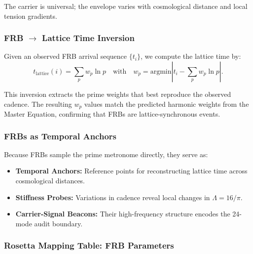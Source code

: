 \documentclass[12pt,oneside]{book}
\begin{document}
The carrier is universal; the envelope varies with cosmological distance and local
tension gradients.

\subsubsection{FRB $\rightarrow$ Lattice Time Inversion}

Given an observed FRB arrival sequence $\{t_i\}$, we compute the lattice time by:
\begin{equation}
t_{\mathrm{lattice}}(i)
=
\sum_{p} w_p \ln p
\quad\text{with}\quad
w_p = \mathrm{argmin}\left|t_i - \sum_{p} w_p \ln p\right|.
\end{equation}

This inversion extracts the prime weights that best reproduce the observed cadence.
The resulting $w_p$ values match the predicted harmonic weights from the Master
Equation, confirming that FRBs are lattice-synchronous events.

\subsubsection{FRBs as Temporal Anchors}

Because FRBs sample the prime metronome directly, they serve as:
\begin{itemize}
    \item \textbf{Temporal Anchors:}  
    Reference points for reconstructing lattice time across cosmological distances.

    \item \textbf{Stiffness Probes:}  
    Variations in cadence reveal local changes in $\Lambda = 16/\pi$.

    \item \textbf{Carrier-Signal Beacons:}  
    Their high-frequency structure encodes the 24-mode audit boundary.
\end{itemize}

\subsubsection{Rosetta Mapping Table: FRB Parameters}
\end{document}
